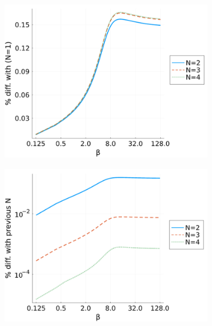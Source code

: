 \begin{figure}[!tbp]
\begin{subfigure}[b]{0.49\textwidth}
    \includegraphics[width=\textwidth]{figures/E_beta.png}
  \end{subfigure}
  \hfill
  \begin{subfigure}[b]{0.49\textwidth}
    \centering
    \includegraphics[width=\textwidth]{figures/E_beta_diff.png}
  \end{subfigure}

\end{figure}
